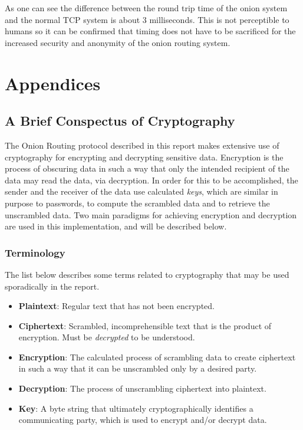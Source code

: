\documentclass[10pt]{report}
\begin{document}
As one can see the difference between the round trip time of the onion system and the normal TCP system is about 3 milliseconds. This is not perceptible to humans so it can be confirmed that timing does not have to be sacrificed for the increased security and anonymity of the onion routing system.


\part*{Appendices}
\begin{appendix}
    \chapter{A Brief Conspectus of Cryptography}
    The Onion Routing protocol described in this report makes extensive use of cryptography for
    encrypting and decrypting sensitive data. Encryption is the process of obscuring data in such a
    way that only the intended recipient of the data may read the data, via decryption. In order for
    this to be accomplished, the sender and the receiver of the data use calculated \textit{keys},
    which are similar in purpose to passwords, to compute the scrambled data and to retrieve the
    unscrambled data. Two main paradigms for achieving encryption and decryption are used in this
    implementation, and will be described below.
    \section{Terminology}
    The list below describes some terms related to cryptography that may be used sporadically in the
    report.
    \begin{itemize}
        \item \textbf{Plaintext}: Regular text that has not been encrypted.
        \item \textbf{Ciphertext}: Scrambled, incomprehensible text that is the product of
            encryption. Must be \textit{decrypted} to be understood.
        \item \textbf{Encryption}: The calculated process of scrambling data to create ciphertext in
            such a way that it can be unscrambled only by a desired party.
        \item \textbf{Decryption}: The process of unscrambling ciphertext into plaintext.
        \item \textbf{Key}: A byte string that ultimately cryptographically identifies a
            communicating party, which is used to encrypt and/or decrypt data.
    \end{itemize}

\end{appendix}
\end{document}
